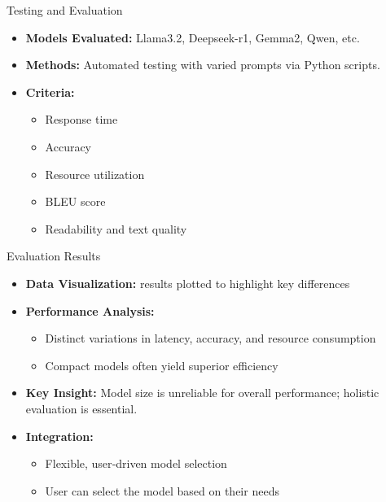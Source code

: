 \documentclass{beamer}
\begin{document}
\begin{frame}{Testing and Evaluation}
  \begin{itemize}
    \item \textbf{Models Evaluated:} Llama3.2, Deepseek-r1, Gemma2, Qwen, etc.
    \item \textbf{Methods:} Automated testing with varied prompts via Python scripts.
    \item \textbf{Criteria:}
      \begin{itemize}
        \item Response time
        \item Accuracy
        \item Resource utilization
        \item BLEU score
        \item Readability and text quality
      \end{itemize}
  \end{itemize}
\end{frame}

\begin{frame}{Evaluation Results}
        \begin{itemize}
        \item \textbf{Data Visualization:} results plotted to highlight key differences
        \item \textbf{Performance Analysis:}
          \begin{itemize}
            \item Distinct variations in latency, accuracy, and resource consumption
            \item Compact models often yield superior efficiency
          \end{itemize}
          \item \textbf{Key Insight:} Model size is unreliable for overall performance; holistic evaluation is essential.
        \item \textbf{Integration:}
          \begin{itemize}
            \item Flexible, user‑driven model selection
            \item User can select the model based on their needs
          \end{itemize}
      \end{itemize}
\end{frame}
\end{document}
